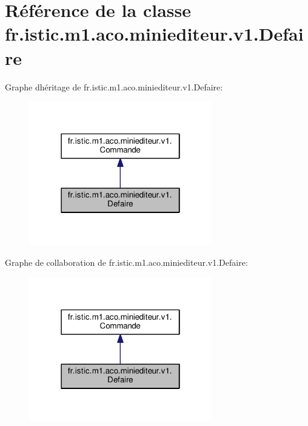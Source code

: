 \hypertarget{classfr_1_1istic_1_1m1_1_1aco_1_1miniediteur_1_1v1_1_1Defaire}{}\section{Référence de la classe fr.\+istic.\+m1.\+aco.\+miniediteur.\+v1.\+Defaire}
\label{classfr_1_1istic_1_1m1_1_1aco_1_1miniediteur_1_1v1_1_1Defaire}


Graphe d\textquotesingle{}héritage de fr.\+istic.\+m1.\+aco.\+miniediteur.\+v1.\+Defaire\+:
\nopagebreak
\begin{figure}[H]
\begin{center}
\leavevmode
\includegraphics[width=226pt]{classfr_1_1istic_1_1m1_1_1aco_1_1miniediteur_1_1v1_1_1Defaire__inherit__graph}
\end{center}
\end{figure}


Graphe de collaboration de fr.\+istic.\+m1.\+aco.\+miniediteur.\+v1.\+Defaire\+:
\nopagebreak
\begin{figure}[H]
\begin{center}
\leavevmode
\includegraphics[width=226pt]{classfr_1_1istic_1_1m1_1_1aco_1_1miniediteur_1_1v1_1_1Defaire__coll__graph}
\end{center}
\end{figure}
